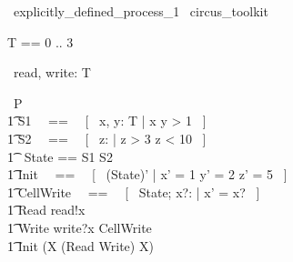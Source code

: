 % 
\begin{zsection}
  \SECTION\ explicitly\_defined\_process\_1 \parents\ circus\_toolkit
\end{zsection}

\begin{zed}
	T == 0 .. 3 
\end{zed}

\begin{circus}
	\circchannel\ read, write: T \\
\end{circus}

\begin{circus}
    \circprocess\ P \circdef \circbegin \\
        \t1 S1 ~~==~~ [~  x, y: T | x  \land y > 1 ~] \\
        \t1 S2 ~~==~~ [~  z: \nat | z > 3 \land z < 10 ~] \\
        \t1 \circstate\ State == S1 \land S2 \\
        \t1 Init ~~==~~ [~ (State)' | x' = 1 \land y' = 2 \land z' = 5 ~] \\
        \t1 CellWrite ~~==~~ [~ \Delta State; x?: \nat | x' = x? ~] \\
        \t1 Read \circdef read!x \then \Skip \\
        \t1 Write \circdef write?x \then \lschexpract CellWrite \rschexpract \\
        \t1 \circspot \lschexpract Init \rschexpract \circseq (\circmu X \circspot (Read \extchoice Write) \circseq X) \\ 
	\circend
\end{circus}

